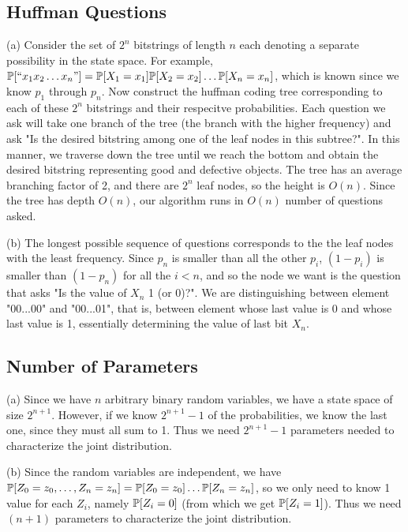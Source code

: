 \subsection{Huffman Questions}
(a) Consider the set of $2^n$ bitstrings of length $n$ each denoting a separate possibility in the state space. For example, $\P[``x_1x_2\dots x_n"] = \P[X_1 = x_1]\P[X_2 = x_2]\dots\P[X_n = x_n]$, which is known since we know $p_1$ through $p_n$. Now construct the huffman coding tree corresponding to each of these $2^n$ bitstrings and their respecitve probabilities. Each question we ask will take one branch of the tree (the branch with the higher frequency) and ask "Is the desired bitstring among one of the leaf nodes in this subtree?". In this manner, we traverse down the tree until we reach the bottom and obtain the desired bitstring representing good and defective objects. The tree has an average branching factor of 2, and there are $2^n$ leaf nodes, so the height is $O(n)$. Since the tree has depth $O(n)$, our algorithm runs in $O(n)$ number of questions asked.

(b) The longest possible sequence of questions corresponds to the the leaf nodes with the least frequency. Since $p_n$ is smaller than all the other $p_i$, $(1-p_i)$ is smaller than $(1 - p_n)$ for all the $i < n$, and so the node we want is the question that asks "Is the value of $X_n$ 1 (or 0)?". We are distinguishing between element "00...00" and "00...01", that is, between element whose last value is 0 and whose last value is 1, essentially determining the value of last bit $X_n$.

\subsection{Number of Parameters}
(a) Since we have $n$ arbitrary binary random variables, we have a state space of size $2^{n + 1}$. However, if we know $2^{n + 1} - 1$ of the probabilities, we know the last one, since they must all sum to 1. Thus we need $2^{n + 1} - 1$ parameters needed to characterize the joint distribution.

(b) Since the random variables are independent, we have $\P[Z_0 = z_0, \dots, Z_n = z_n] = \P[Z_0 = z_0]\dots\P[Z_n = z_n]$, so we only need to know 1 value for each $Z_i$, namely $\P[Z_i = 0]$ (from which we get $\P[Z_i = 1]$). Thus we need $(n + 1)$ parameters to characterize the joint distribution.

